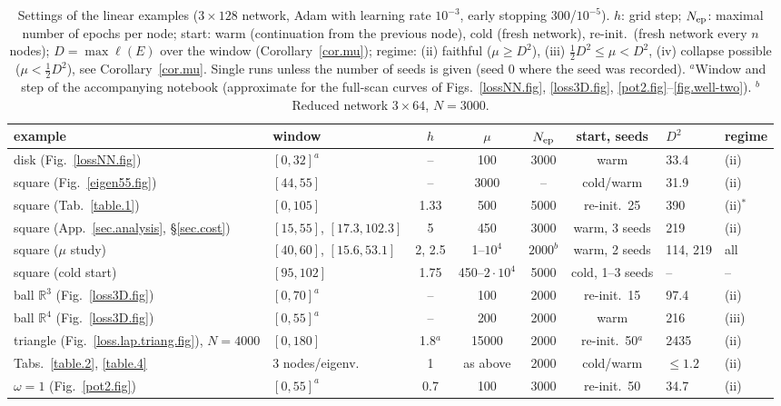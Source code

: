 \documentclass[10pt]{amsart}
\theoremstyle{definition}
\theoremstyle{remark}
\theoremstyle{plain}
\newcommand{\R}{\mathbb{R}}
\begin{document}
\begin{table}[H]
\centering\scriptsize
\caption{Settings of the linear examples ($3\times128$ network, Adam with learning rate $10^{-3}$,
early stopping 300/$10^{-5}$). $h$: grid step; $N_{\rm ep}$: maximal number of epochs per node;
start: warm (continuation from the previous node), cold (fresh network), re-init.\ (fresh network
every $n$ nodes); $D=\max\ell(E)$ over the window (Corollary~\ref{cor.mu}); regime: (ii) faithful
($\mu\ge D^2$), (iii) $\frac12D^2\le\mu<D^2$, (iv) collapse possible ($\mu<\frac12D^2$), see
Corollary~\ref{cor.mu}. Single runs unless the number of seeds is given (seed 0 where the seed was
recorded). $^a$Window and step of the accompanying notebook (approximate for the full-scan curves of
Figs.~\ref{lossNN.fig}, \ref{loss3D.fig}, \ref{pot2.fig}--\ref{fig.well-two}). $^b$Reduced network $3\times64$, $N=3000$.}
\label{table.settings}
\begin{tabular}{@{}llccccll@{}}
\toprule
example & window & $h$ & $\mu$ & $N_{\rm ep}$ & start, seeds & $D^2$ & regime\\
\midrule
disk (Fig.~\ref{lossNN.fig}) & $[0,32]^a$ & -- & 100 & 3000 & warm & 33.4 & (ii)\\
square (Fig.~\ref{eigen55.fig}) & $[44,55]$ & -- & 3000 & -- & cold/warm & 31.9 & (ii)\\
square (Tab.~\ref{table.1}) & $[0,105]$ & 1.33 & 500 & 5000 & re-init.\ 25 & 390 & (ii)$^\ast$\\
square (App.~\ref{sec.analysis}, \S\ref{sec.cost}) & $[15,55]$, $[17.3,102.3]$ & 5 & 450 & 3000 & warm, 3 seeds & 219 & (ii)\\
square ($\mu$ study) & $[40,60]$, $[15.6,53.1]$ & 2, 2.5 & 1--$10^4$ & $2000^b$ & warm, 2 seeds & 114, 219 & all\\
square (cold start) & $[95,102]$ & 1.75 & 450--$2\cdot10^4$ & 5000 & cold, 1--3 seeds & -- & --\\
ball $\R^3$ (Fig.~\ref{loss3D.fig}) & $[0,70]^a$ & -- & 100 & 2000 & re-init.\ 15 & 97.4 & (ii)\\
ball $\R^4$ (Fig.~\ref{loss3D.fig}) & $[0,55]^a$ & -- & 200 & 2000 & warm & 216 & (iii)\\
triangle (Fig.~\ref{loss.lap.triang.fig}), $N\!=\!4000$ & $[0,180]$ & 1.8$^a$ & 15000 & 2000 & re-init.\ 50$^a$ & 2435 & (ii)\\
Tabs.~\ref{table.2}, \ref{table.4} & 3 nodes/eigenv. & 1 & as above & 2000 & cold/warm & $\le1.2$ & (ii)\\
$\omega=1$ (Fig.~\ref{pot2.fig}) & $[0,55]^a$ & 0.7 & 100 & 3000 & re-init.\ 50 & 34.7 & (ii)\\

\end{tabular}
\end{table}
\end{document}
